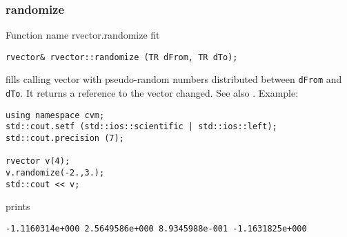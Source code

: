 \subsubsection{randomize}
Function%
\pdfdest name {rvector.randomize} fit
\begin{verbatim}
rvector& rvector::randomize (TR dFrom, TR dTo);
\end{verbatim}
fills calling vector with pseudo-random numbers distributed between
\verb"dFrom" and \verb"dTo".
It returns a reference to the vector changed.
See also
.
Example:
\begin{Verbatim}
using namespace cvm;
std::cout.setf (std::ios::scientific | std::ios::left); 
std::cout.precision (7);

rvector v(4);
v.randomize(-2.,3.);
std::cout << v;
\end{Verbatim}
prints
\begin{Verbatim}
-1.1160314e+000 2.5649586e+000 8.9345988e-001 -1.1631825e+000
\end{Verbatim}
\newpage

